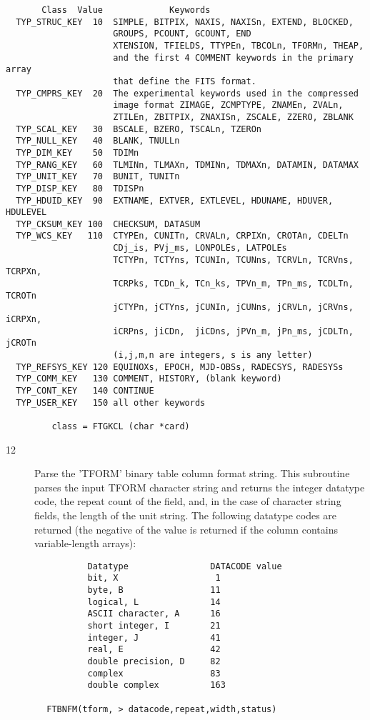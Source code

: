 \documentclass[11pt]{book}
\begin{document}
\begin{verbatim}
       Class  Value             Keywords
  TYP_STRUC_KEY  10  SIMPLE, BITPIX, NAXIS, NAXISn, EXTEND, BLOCKED,
                     GROUPS, PCOUNT, GCOUNT, END
                     XTENSION, TFIELDS, TTYPEn, TBCOLn, TFORMn, THEAP,
                     and the first 4 COMMENT keywords in the primary array
                     that define the FITS format.
  TYP_CMPRS_KEY  20  The experimental keywords used in the compressed
                     image format ZIMAGE, ZCMPTYPE, ZNAMEn, ZVALn,
                     ZTILEn, ZBITPIX, ZNAXISn, ZSCALE, ZZERO, ZBLANK
  TYP_SCAL_KEY   30  BSCALE, BZERO, TSCALn, TZEROn
  TYP_NULL_KEY   40  BLANK, TNULLn
  TYP_DIM_KEY    50  TDIMn
  TYP_RANG_KEY   60  TLMINn, TLMAXn, TDMINn, TDMAXn, DATAMIN, DATAMAX
  TYP_UNIT_KEY   70  BUNIT, TUNITn
  TYP_DISP_KEY   80  TDISPn
  TYP_HDUID_KEY  90  EXTNAME, EXTVER, EXTLEVEL, HDUNAME, HDUVER, HDULEVEL
  TYP_CKSUM_KEY 100  CHECKSUM, DATASUM
  TYP_WCS_KEY   110  CTYPEn, CUNITn, CRVALn, CRPIXn, CROTAn, CDELTn
                     CDj_is, PVj_ms, LONPOLEs, LATPOLEs
                     TCTYPn, TCTYns, TCUNIn, TCUNns, TCRVLn, TCRVns, TCRPXn,
                     TCRPks, TCDn_k, TCn_ks, TPVn_m, TPn_ms, TCDLTn, TCROTn
                     jCTYPn, jCTYns, jCUNIn, jCUNns, jCRVLn, jCRVns, iCRPXn,
                     iCRPns, jiCDn,  jiCDns, jPVn_m, jPn_ms, jCDLTn, jCROTn
                     (i,j,m,n are integers, s is any letter)
  TYP_REFSYS_KEY 120 EQUINOXs, EPOCH, MJD-OBSs, RADECSYS, RADESYSs
  TYP_COMM_KEY   130 COMMENT, HISTORY, (blank keyword)
  TYP_CONT_KEY   140 CONTINUE
  TYP_USER_KEY   150 all other keywords

         class = FTGKCL (char *card)
\end{verbatim}

\begin{description}
\item[12] Parse the 'TFORM' binary table column format string.
    This subroutine parses the input TFORM character string and returns the
    integer datatype code, the repeat count of the field, and, in the case
    of character string fields, the length of the unit string.  The following
    datatype codes are returned (the negative of the value is returned
   if the column contains variable-length arrays):
\end{description}

\begin{verbatim}
                Datatype                DATACODE value
                bit, X                   1
                byte, B                 11
                logical, L              14
                ASCII character, A      16
                short integer, I        21
                integer, J              41
                real, E                 42
                double precision, D     82
                complex                 83
                double complex          163

        FTBNFM(tform, > datacode,repeat,width,status)
\end{verbatim}
\end{document}
